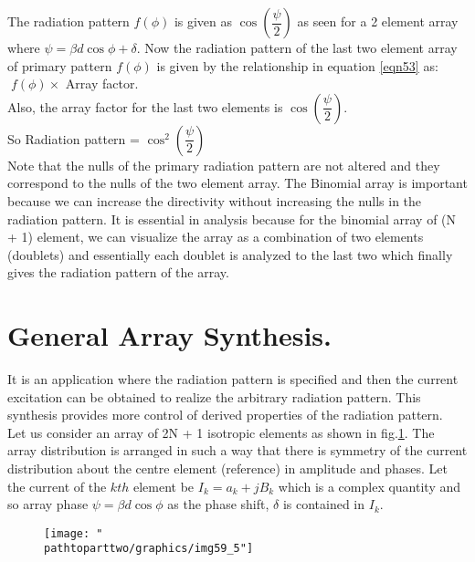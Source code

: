 The radiation pattern $f(\phi)$ is given as $\cos(\dfrac{\psi}{2})$ as seen for a 2 element array where $\psi = \beta d\cos\phi + \delta$. Now the radiation pattern of the last two element array of primary pattern $f(\phi)$ is given by the relationship in equation \ref{eqn53} as:   $\; f(\phi) \times$ Array factor. \\
Also, the array factor for the last two elements is $\cos(\dfrac{\psi}{2})$.\\
So Radiation pattern = $\cos^2(\dfrac{\psi}{2})$\\
Note that the nulls of the primary radiation pattern are not altered and they correspond to the nulls of the two element array. The Binomial array is important because we can increase the directivity without increasing the nulls in the radiation pattern. It is essential in analysis because for the binomial array of (N + 1) element, we can visualize the array as a combination of two elements (doublets) and essentially each doublet is analyzed to the last two which finally gives the radiation pattern of the array.

\section{General Array Synthesis.}
It is an application where the radiation pattern is specified and then the current excitation can be obtained to realize the arbitrary radiation pattern. This synthesis provides more control of derived properties of the radiation pattern.\\
Let us consider an array of 2N + 1 isotropic elements as shown in fig.\ref{fig:fig-4}. The array distribution is arranged in such a way that there is symmetry of the current distribution about the centre element (reference) in amplitude and phases. Let the current of the $kth$ element be $I_k =a_k + jB_k$ which is a complex quantity and so array phase $\psi =\beta d\cos\phi$ as the phase shift, $\delta$ is contained in $I_k$.
\begin{figure}[h]
\centering
\texttt{[image: "\\pathtoparttwo/graphics/img59\_5"]}
\caption{}
\label{fig:fig-4}
\end{figure}

